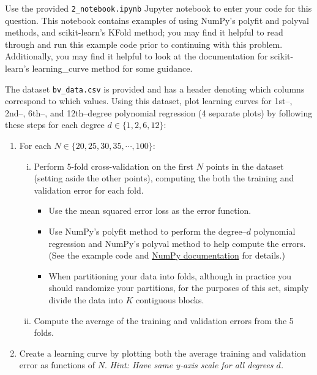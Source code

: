 \begin{problem}[14]
    Use the provided \texttt{2_notebook.ipynb} Jupyter notebook to enter your code for this question. This notebook contains examples of using NumPy's polyfit and polyval methods, and scikit-learn's KFold method; you may find it helpful to read through and run this example code prior to continuing with this problem. Additionally, you may find it helpful to look at the documentation for scikit-learn's learning_curve method for some guidance.

The dataset \texttt{bv_data.csv} is provided and has a header denoting which columns correspond to which values. Using this dataset, plot learning curves for 1st--, 2nd--, 6th--, and 12th--degree polynomial regression (4 separate plots) by following these steps for each degree $d \in \{1, 2, 6, 12\}$:

  \begin{enumerate}
    \item For each $N \in \{20, 25, 30, 35, \cdots, 100\}$:
    \begin{enumerate}[i.]
      \item Perform 5-fold cross-validation on the first $N$ points in the dataset (setting aside the other points), computing the both the training and validation error for each fold. 
      \begin{itemize}
        \item Use the mean squared error loss as the error function.
        \item Use NumPy's polyfit method to perform the degree--$d$ polynomial regression and NumPy's polyval method to help compute the errors.  (See the example code and \href{https://docs.scipy.org/doc/NumPy/reference/routines.polynomials.poly1d.html}{NumPy documentation} for details.)
        \item When partitioning your data into folds, although in practice you should randomize your partitions, for the purposes of this set, simply divide the data into $K$ contiguous blocks.
      \end{itemize}
      \item Compute the average of the training and validation errors from the 5 folds.
    \end{enumerate}
    \item Create a learning curve by plotting both the average training and validation error as functions of $N$. \textit{Hint: Have same y-axis scale for all degrees $d$.}
  \end{enumerate}

\end{problem}
